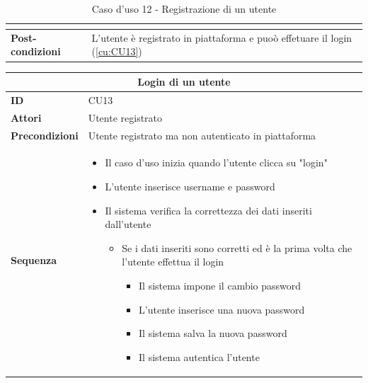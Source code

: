 \documentclass[a4paper,11pt]{article}
\begin{document}
\begin{table}[H]
\begin{tabular}{|m{2cm}|m{10.5cm}|}
\begin{itemize}
\begin{itemize}
\begin{itemize}
\begin{itemize}
                            \end{itemize}
                    \end{itemize}
            \end{itemize}
    \end{itemize}                          \\ \hline
    \multicolumn{1}{|l|}{\textbf{Post-condizioni}} & L'utente è registrato in piattaforma e puoò effetuare il login (\ref{cu:CU13}) \\ \hline
  \end{tabular}
  \caption{Caso d'uso 12 - Registrazione di un utente}
  \label{cu:CU12}
\end{table}


\begin{table}[H]
  \centering
  \begin{tabular}{|m{2cm}|m{10.5cm}|}
    \hline
    \multicolumn{2}{|c|}{\textbf{Login di un utente}}                                                    \\ \hline
    \multicolumn{1}{|l|}{\textbf{ID}}              & CU13                                                \\ \hline
    \multicolumn{1}{|l|}{\textbf{Attori}}          & Utente registrato                                   \\ \hline
    \multicolumn{1}{|l|}{\textbf{Precondizioni}}   & Utente registrato ma non autenticato in piattaforma \\ \hline
    \multicolumn{1}{|l|}{\textbf{Sequenza}}        &
    \begin{itemize}
      \item Il caso d'uso inizia quando l'utente clicca su "login"
      \item L'utente inserisce username e password
      \item Il sistema verifica la correttezza dei dati inseriti dall'utente
            \begin{itemize}
              \item Se i dati inseriti sono corretti ed è la prima volta che l'utente effettua il login
                    \begin{itemize}
                      \item Il sistema impone il cambio password
                      \item L'utente inserisce una nuova password
                      \item Il sistema salva la nuova password
                      \item Il sistema autentica l'utente

\end{itemize}
\end{itemize}
\end{itemize}
\end{tabular}
\end{table}
\end{document}
